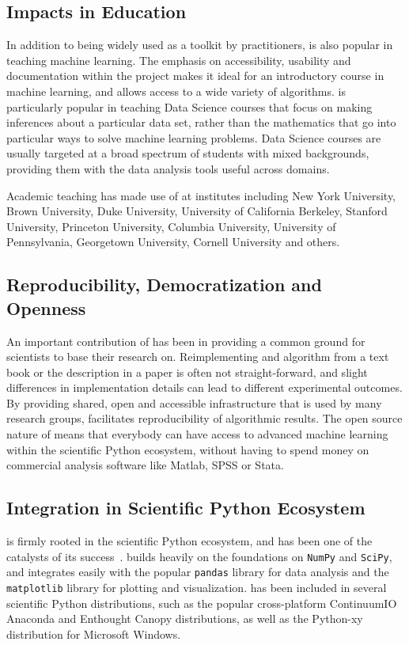 \subsection{Impacts in Education}
In addition to being widely used as a toolkit by practitioners,
\sklearn{} is also popular in teaching machine learning.
The emphasis on accessibility, usability and documentation within
the \sklearn{} project makes it ideal for an introductory
course in machine learning, and allows access to a wide variety
of algorithms. \sklearn{} is particularly popular in teaching
Data Science courses that focus on making inferences about
a particular data set, rather than the mathematics that go into
particular ways to solve machine learning problems.
Data Science courses are usually targeted at a broad spectrum
of students with mixed backgrounds, providing them
with the data analysis tools useful across domains.

Academic teaching has made use of \sklearn{} at institutes including New York
University, Brown University, Duke University, University of California
Berkeley, Stanford University, Princeton University, Columbia University,
University of Pennsylvania, Georgetown University, Cornell University and
others.

\subsection{Reproducibility, Democratization and Openness}
An important contribution of \sklearn{} has been in providing a common
ground for scientists to base their research on. Reimplementing
and algorithm from a text book or the description in a paper is often not
straight-forward, and slight differences in implementation details can
lead to different experimental outcomes. By providing shared, open and 
accessible infrastructure that is used by many research groups,
\sklearn{} facilitates reproducibility of algorithmic results.
The open source nature of \sklearn{} means that everybody can have access
to advanced machine learning within the scientific Python ecosystem,
without having to spend money on commercial analysis software like Matlab,
SPSS or Stata.

\subsection{Integration in Scientific Python Ecosystem}
\sklearn{} is firmly rooted in the scientific Python ecosystem, and has been
one of the catalysts of its success~\autocite{benlorica, infoworld}. \sklearn{}
builds heavily on the foundations on \texttt{NumPy} and \texttt{SciPy}, and
integrates easily with the popular \texttt{pandas} library for data analysis and the
\texttt{matplotlib} library for plotting and visualization.
\sklearn{} has been included in several scientific Python distributions, such
as the popular cross-platform ContinuumIO Anaconda and Enthought Canopy
distributions, as well as the Python-xy distribution for Microsoft Windows.

